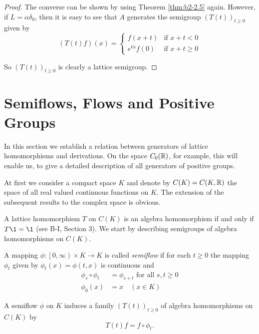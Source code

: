\begin{proof}
The converse can be shown by using Theorem \ref{thm:b2-2.5} again.
However, if $L = \alpha\delta_{0}$, then it is easy to see that $A$ generates the semigroup $(T(t))_{t \geq 0}$ given by
\begin{equation*}
(T(t)f)(x) = \begin{cases}
    f(x+t) & \text{if } x+t < 0 \\
    e^{t\alpha}f(0) & \text{if } x+t \geq 0
\end{cases}
\end{equation*}

So $(T(t))_{t \geq 0}$ is clearly a lattice semigroup.
\end{proof}


\section{Semiflows, Flows and Positive Groups}\label{sec:b2-3}

In this section we establish a relation between generators of lattice homomorphisms and derivations.
On the space $C_{0}(\mathbb{R})$, for example, this will enable us, to give a detailed description of all generators of positive groups.

At first we consider a compact space $K$ and denote by $C(K) = C(K,\mathbb{R})$ the space of all real valued continuous functions on $K$.
The extension of the subsequent results to the complex space is obvious.

A lattice homomorphism $T$ on $C(K)$ is an algebra homomorphism if and only if $T \1 = \1$ (see B-I, Section 3).
We start by describing semigroups of algebra homomorphisms on $C(K)$.

\begin{definition}\label{def:b2-3.1}
A mapping $\phi \colon \left[0,\infty\right) \times K \to K$ is called \emph{semiflow} if for each $t \geq 0$ the mapping $\phi_{t}$ given by $\phi_{t}(x) = \phi(t,x)$ is continuous and
\begin{align}
\phi_{s} \circ \phi_{t} &= \phi_{s+t} \text{ for all } s,t \geq 0 \label{eq:b2-3.1} \\
\phi_{0}(x) &= x \quad (x \in K) \label{eq:b2-3.2}
\end{align}
\end{definition}

A semiflow $\phi$ on $K$ induces a family $(T(t))_{t \geq 0}$ of algebra homomorphisms on $C(K)$ by
\begin{equation}\label{eq:b2-3.3}
T(t)f = f \circ \phi_{t}.
\end{equation}

